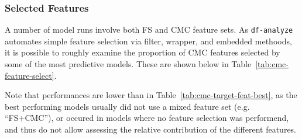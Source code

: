 \documentclass{article}
\begin{document}




\subsubsection{Selected Features}

A number of model runs involve both FS and CMC feature sets. As \texttt{df-analyze}
automates simple feature selection via filter, wrapper, and embedded
methoods, it is possible to roughly examine the proportion of CMC features
selected by some of the most predictive models. These are shown below in
Table~\ref{tab:cmc-feature-select}.

Note that performances are lower than in
Table~\ref{tab:cmc-target-feat-best}, as the best performing models usually
did not use a mixed feature set (e.g. ``FS+CMC''), or occured in models where
no feature selection was performend, and thus do not allow assessing the
relative contribution of the different features.
\end{document}
